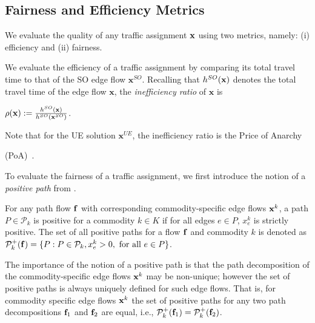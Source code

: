 \documentclass{article}
\newif\ifarxiv   %
\begin{document}
\subsection{Fairness and Efficiency Metrics} \label{sec:fair-eff-metric}
\ifarxiv
We evaluate the quality of any given traffic assignment $\x$, which satisfies Constraints~\eqref{eq:edge-constraint}-\eqref{eq:nonnegativity-constraints}, using two metrics, namely: (i) efficiency, which is of importance to a traffic authority as well as all users collectively, and (ii) fairness, which is of direct importance to each user.
\else
We evaluate the quality of any traffic assignment $\x$ using two metrics, namely: (i) efficiency and (ii) fairness.
\fi

We evaluate the efficiency of a traffic assignment by comparing its total travel time to that of the SO edge flow $\mathbf{x}^{SO}$. Recalling that $h^{SO}(\mathbf{x})$ denotes the total travel time of the edge flow $\mathbf{x}$, %
the \textit{inefficiency ratio} of $\mathbf{x}$ is
\ifarxiv 
\begin{equation}
    \rho(\mathbf{x}) := \frac{\objso(\mathbf{x})}{\objso(\mathbf{x}^{SO})}.
\end{equation}
\else
$\rho(\mathbf{x}) := \frac{h^{SO}(\mathbf{x})}{h^{SO}(\mathbf{x}^{SO})}$.
\fi 
Note that for the UE solution $\mathbf{x}^{UE}$, the inefficiency ratio is the Price of Anarchy  
\ifarxiv 
(PoA)~\cite{worst-case-equilibria}, which we denote as~$\Bar{\rho}$.
\else
(PoA)~\cite{worst-case-equilibria}.
\fi  




To evaluate the fairness of a traffic assignment, we first introduce the notion of a \textit{positive path} from \cite{basu2017reconciling}.
\begin{definition} 
For any path flow $\mathbf{f}$ with corresponding commodity-specific edge flows $\mathbf{x}^k$, a path $P \in \mathcal{P}_k$ is positive for a commodity $k \in K$ if for all edges $e \in P$, $x_e^k$ is strictly positive. The set of all positive paths for a flow $\mathbf{f}$ and commodity $k$ is denoted as $\mathcal{P}_{k}^{+}(\mathbf{f}) = \{P:P \in \mathcal{P}_k, x_e^k>0, \text{ for all } e \in P \}$.
\end{definition}
The importance of the notion of a positive path is that the path decomposition of the commodity-specific edge flows $\mathbf{x}^k$ may be non-unique; however the set of positive paths is always uniquely defined for such edge flows. That is, for commodity specific edge flows $\mathbf{x}^k$ the set of positive paths for any two path decompositions $\mathbf{f}_1$ and $\mathbf{f}_2$ are equal, i.e., $\mathcal{P}_{k}^{+}(\mathbf{f}_1) = \mathcal{P}_{k}^{+}(\mathbf{f}_2)$.
\end{document}
